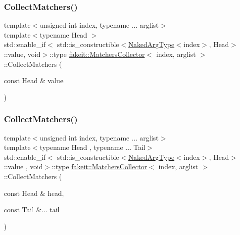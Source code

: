 \mbox{\label{classfakeit_1_1MatchersCollector_affd243a89f758239d77c70dce6318087}} 
\subsubsection{\texorpdfstring{CollectMatchers()}{CollectMatchers()}\hspace{0.1cm}{\footnotesize\ttfamily [13/63]}}
{\footnotesize\ttfamily template$<$unsigned int index, typename ... arglist$>$ \\
template$<$typename Head $>$ \\
std\+::enable\+\_\+if$<$ std\+::is\+\_\+constructible$<$\mbox{\hyperlink{classfakeit_1_1MatchersCollector_aeda8ced6a2f0cb7c6e4f916f18a91730}{Naked\+Arg\+Type}}$<$index$>$, Head$>$\+::value, void$>$\+::type \mbox{\hyperlink{classfakeit_1_1MatchersCollector}{fakeit\+::\+Matchers\+Collector}}$<$ index, arglist $>$\+::Collect\+Matchers (\begin{DoxyParamCaption}\item[{const Head \&}]{value }\end{DoxyParamCaption})\hspace{0.3cm}{\ttfamily [inline]}}

\mbox{\label{classfakeit_1_1MatchersCollector_a29c5245d03b8fab3773455c087edde74}} 
\subsubsection{\texorpdfstring{CollectMatchers()}{CollectMatchers()}\hspace{0.1cm}{\footnotesize\ttfamily [14/63]}}
{\footnotesize\ttfamily template$<$unsigned int index, typename ... arglist$>$ \\
template$<$typename Head , typename ... Tail$>$ \\
std\+::enable\+\_\+if$<$ std\+::is\+\_\+constructible$<$\mbox{\hyperlink{classfakeit_1_1MatchersCollector_aeda8ced6a2f0cb7c6e4f916f18a91730}{Naked\+Arg\+Type}}$<$index$>$, Head$>$\+::value , void$>$\+::type \mbox{\hyperlink{classfakeit_1_1MatchersCollector}{fakeit\+::\+Matchers\+Collector}}$<$ index, arglist $>$\+::Collect\+Matchers (\begin{DoxyParamCaption}\item[{const Head \&}]{head,  }\item[{const Tail \&...}]{tail }\end{DoxyParamCaption})\hspace{0.3cm}{\ttfamily [inline]}}

